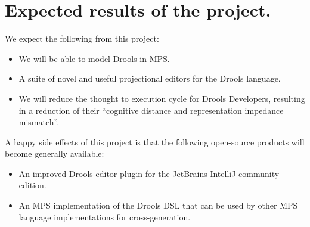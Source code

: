 \section{Expected results of the project.} 

We expect the following from this project:
\begin{itemize}
    \item We will be able to model Drools in MPS.
    \item A suite of novel and useful projectional editors for the Drools language.
    \item We will reduce the thought to execution cycle for Drools Developers, resulting in a reduction of their ``cognitive distance and representation impedance mismatch''\cite{live_literals}.
\end{itemize}

A happy side effects of this project is that the following open-source products will become generally available:
\begin{itemize}
    \item An improved Drools editor plugin for the JetBrains IntelliJ community edition.
	\item An MPS implementation of the Drools DSL that can be used by other MPS language implementations for cross-generation.
\end{itemize}

